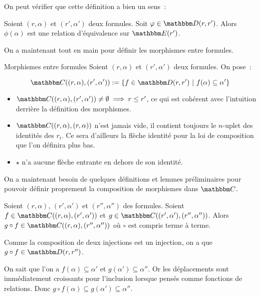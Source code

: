 On peut vérifier que cette définition a bien un sens~:

\begin{lem}
    Soient $(r,\alpha)$ et $(r',\alpha')$ deux formules. Soit $\phi\in\D(r,r')$.
    Alors $\phi(\alpha)$ est une relation d'équivalence sur $\E(r')$.
\end{lem}

On a maintenant tout en main pour définir les morphismes entre formules.

\begin{defi}{Morphismes entre formules}
    Soient $(r,\alpha)$ et $(r',\alpha')$ deux formules. On pose~:

    \[\C((r,\alpha),(r',\alpha')) := \{ f\in\D(r,r') ~|~
                                        f(\alpha)\subseteq \alpha' \}\]
\end{defi}

\begin{rem}\begin{itemize}
    \item $\C((r,\alpha), (r',\alpha'))\neq\emptyset \implies r\leq r'$, ce qui
        est cohérent avec l'intuition derrière la définition des morphismes.
    \item $\C((r,\alpha), (r,\alpha))$ n'est jamais vide, il contient toujours le $n$-uplet
        des identités des $r_i$. Ce sera d'ailleurs la flèche identité pour la loi
        de composition que l'on définira plus bas.
    \item $\star$ n'a aucune flèche entrante en dehors de son identité.
\end{itemize}\end{rem}

On a maintenant besoin de quelques définitions et lemmes préliminaires pour pouvoir
définir proprement la composition de morphismes dans $\C$.

\begin{lem}
    Soient $(r,\alpha)$, $(r',\alpha')$ et $(r'',\alpha'')$ des formules.
    Soient $f\in\C((r,\alpha),(r',\alpha'))$
        et $g\in\C((r',\alpha'),(r'',\alpha''))$.
    Alors $g\circ f\in\C((r,\alpha),(r'',\alpha''))$ où $\circ$ est compris
    terme à terme.
\end{lem}

\begin{pv}
    Comme la composition de deux injections est un injection, on a que
    $g\circ f\in\D(r,r'')$.

    On sait que l'on a $f(\alpha)\subseteq \alpha'$ et $g(\alpha')\subseteq \alpha''$. Or
    les déplacements sont immédiatement croissants pour l'inclusion lorsque pensés
    comme fonctions de relations.
    Donc $g\circ f(\alpha)\subseteq g(\alpha')\subseteq \alpha''$.
\end{pv}

